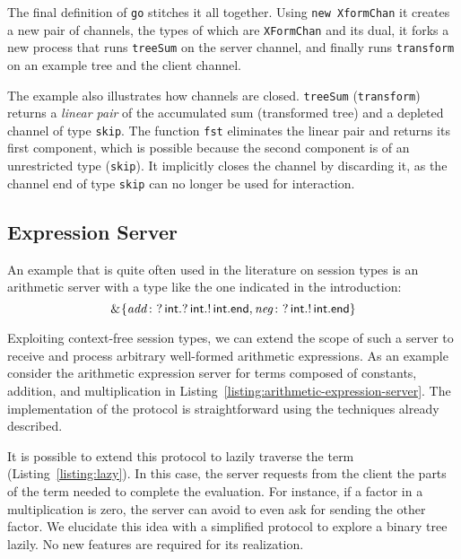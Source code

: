 The final definition of \lstinline|go| stitches it all together. Using
\lstinline{new XformChan} it creates a new pair of channels, the types
of which are \lstinline{XFormChan} and its dual, it forks a new
process that runs \lstinline{treeSum} on the server channel, and
finally runs \lstinline{transform} on an example tree and the client channel.

The example also illustrates how channels are
closed. \lstinline|treeSum| (\lstinline|transform|) returns a
\emph{linear pair} of the accumulated sum (transformed tree) and a
depleted channel of type \lstinline|skip|. The function
\lstinline|fst| eliminates the linear pair and returns its first
component, which is possible because the second component is of an
unrestricted type (\lstinline|skip|). It implicitly closes the channel
by discarding it, as the channel end of type \lstinline|skip| can no longer be used for
interaction.


\subsection{Expression Server}
\label{sec:expression-server}

An example that is quite often used in the literature on session types
is an arithmetic server with a type like the one indicated in the
introduction:
\begin{displaymath}
  \&^{{}}\{
    \mathit{add}\colon \textup{?}\,\mathsf{int}.\textup{?}\,\mathsf{int}.\textup{!}\,\mathsf{int}.\mathsf{end}
    ,
    \mathit{neg}\colon \textup{?}\,\mathsf{int}.\textup{!}\,\mathsf{int}.\mathsf{end}
  \}
\end{displaymath}


 
Exploiting context-free session types, we can extend the scope of such
a server to receive and process arbitrary well-formed arithmetic
expressions. As an example consider the arithmetic expression server
for terms composed of constants, addition, and multiplication in
Listing~\ref {listing:arithmetic-expression-server}.
%
The implementation of the protocol is straightforward using the
techniques already described.

It is possible to extend this protocol to lazily traverse the term
(Listing~\ref{listing:lazy}). In this case, the server requests from
the client the parts of the term needed to complete the
evaluation. For instance, if a factor in a multiplication is zero, the
server can avoid to even ask for sending the other factor. We
elucidate this idea with a simplified protocol to explore a binary
tree lazily. No new features are required for its realization.

